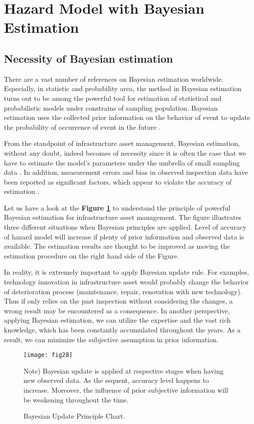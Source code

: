 \section{Hazard Model with Bayesian Estimation}
\label{25}
\subsection{Necessity of Bayesian estimation}
\label{251}
There are a vast number of references on Bayesian estimation worldwide. Especially, in statistic and probability area, the method in Bayesian estimation turns out to be among the powerful tool for estimation of statistical and probabilistic models under constrains of sampling population. Bayesian estimation uses the collected prior information on the behavior of event to update the probability of occurrence of event in the future \cite{wago}.

From the standpoint of infrastructure asset management, Bayesian estimation, without any doubt, indeed becomes of necessity since it is often the case that we have to estimate the model's parameters under the umbrella of small sampling data \cite{fenghong,ben-akiva93,ben-akiva95}. In addition, measurement errors and bias in observed inspection data have been reported as significant factors, which appear to violate the accuracy of estimation \cite{mishalanigong}. 

Let us have a look at the \textbf{Figure \ref{fig28}} to understand the principle of powerful Bayesian estimation for infrastructure asset management. The figure illustrates three different situations when Bayesian principles are applied. Level of accuracy of hazard model will increase if plenty of prior information and observed data is available. The estimation results are thought to be improved as moving the estimation procedure on the right hand side of the Figure.

In reality, it is extremely important to apply Bayesian update rule. For examples, technology innovation in infrastructure asset would probably change the behavior of deterioration process (maintenance, repair, renovation with new technology). Thus if only relies on the past inspection without considering the changes, a wrong result may be encountered as a consequence. In another perspective, applying Bayesian estimation, we can utilize the expertise and the vast rich knowledge, which has been constantly accumulated throughout the years. As a result, we can minimize the subjective assumption in prior information.
\begin{figure}[t]
\begin{center}
\texttt{[image: fig28]} 
\end{center}
\footnotesize Note) Bayesian update is applied at respective stages when having new observed data. As the sequent, accuracy level happens to increase. Moreover, the influence of prior subjective information will be weakening throughout the time.
\caption{Bayesian Update Principle Chart.}
\label{fig28} 
\end{figure}

